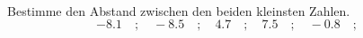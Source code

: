 \begin{aufgabe} ~ \\ 
Bestimme den Abstand zwischen den beiden kleinsten Zahlen.\[-8.1\quad ; \quad-8.5\quad ; \quad4.7\quad ; \quad7.5\quad ; \quad-0.8\quad ; \quad\]\underline{\hspace{12cm}}\end{aufgabe} 
